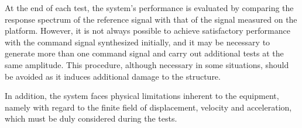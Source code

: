 \documentclass[9pt]{extarticle}
\begin{document}
At the end of each test, the system's performance is evaluated by comparing the response spectrum of the reference signal with that of the signal measured on the platform. However, it is not always possible to achieve satisfactory performance with the command signal synthesized initially, and it may be necessary to generate more than one command signal and carry out additional tests at the same amplitude. This procedure, although necessary in some situations, should be avoided as it induces additional damage to the structure.

In addition, the system faces physical limitations inherent to the equipment, namely with regard to the finite field of displacement, velocity and acceleration, which must be duly considered during the tests.
\end{document}

